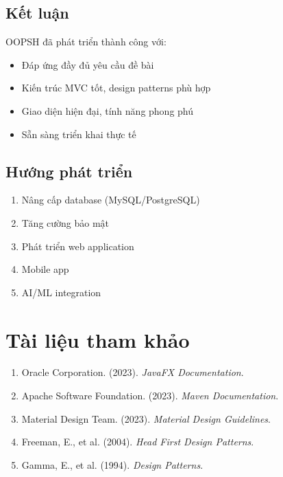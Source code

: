 \documentclass[12pt,a4paper]{article}
\begin{document}
\subsection{Kết luận}

OOPSH đã phát triển thành công với:
\begin{itemize}
    \item Đáp ứng đầy đủ yêu cầu đề bài
    \item Kiến trúc MVC tốt, design patterns phù hợp
    \item Giao diện hiện đại, tính năng phong phú
    \item Sẵn sàng triển khai thực tế
\end{itemize}

\subsection{Hướng phát triển}

\begin{enumerate}
    \item Nâng cấp database (MySQL/PostgreSQL)
    \item Tăng cường bảo mật
    \item Phát triển web application
    \item Mobile app
    \item AI/ML integration
\end{enumerate}

\section{Tài liệu tham khảo}

\begin{enumerate}
    \item Oracle Corporation. (2023). \textit{JavaFX Documentation}.
    \item Apache Software Foundation. (2023). \textit{Maven Documentation}.
    \item Material Design Team. (2023). \textit{Material Design Guidelines}.
    \item Freeman, E., et al. (2004). \textit{Head First Design Patterns}.
    \item Gamma, E., et al. (1994). \textit{Design Patterns}.
\end{enumerate}
\end{document}
